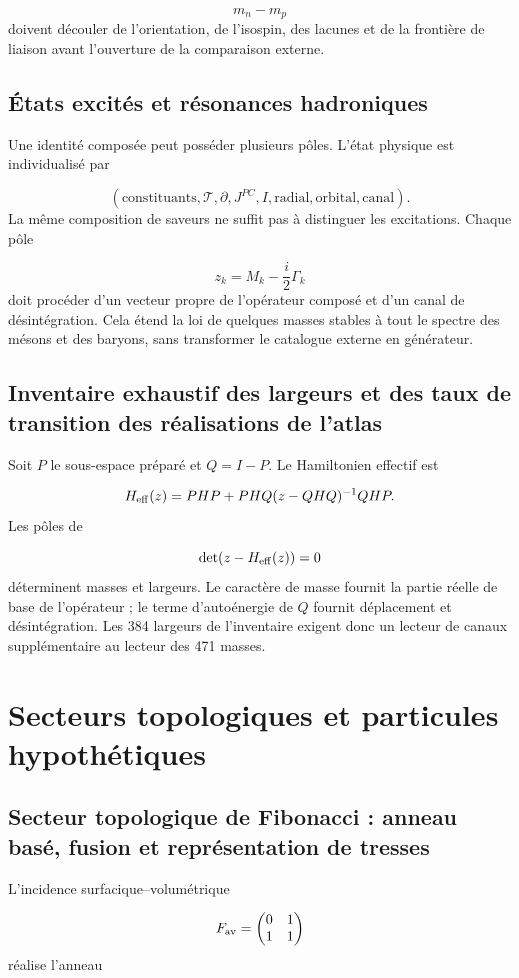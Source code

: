 \[
 m_n-m_p
\]
doivent découler de l'orientation, de l'isospin, des lacunes et de la frontière de liaison avant l'ouverture de la comparaison externe.

\subsection{États excités et résonances hadroniques}
Une identité composée peut posséder plusieurs pôles. L'état physique est individualisé par

\[
 (\text{constituants},\mathcal T,\partial,
 J^{PC},I,\text{radial},\text{orbital},\text{canal}).
\]
La même composition de saveurs ne suffit pas à distinguer les excitations. Chaque pôle

\[
 z_k=M_k-\frac{i}{2}\Gamma_k
\]
doit procéder d'un vecteur propre de l'opérateur composé et d'un canal de désintégration. Cela étend la loi de quelques masses stables à tout le spectre des mésons et des baryons, sans transformer le catalogue externe en générateur.

\subsection{Inventaire exhaustif des largeurs et des taux de transition des réalisations de l'atlas}
Soit \(P\) le sous-espace préparé et \(Q=I-P\). Le Hamiltonien effectif est

\[
 H_{\rm eff}(z)
 =PHP+PHQ(z-QHQ)^{-1}QHP.
\]
Les pôles de

\[
 \det(z-H_{\rm eff}(z))=0
\]
déterminent masses et largeurs. Le caractère de masse fournit la partie réelle de base de l'opérateur ; le terme d'autoénergie de \(Q\) fournit déplacement et désintégration. Les 384 largeurs de l'inventaire exigent donc un lecteur de canaux supplémentaire au lecteur des 471 masses.

\section{Secteurs topologiques et particules hypothétiques}
\subsection{Secteur topologique de Fibonacci : anneau basé, fusion et représentation de tresses}
L'incidence surfacique--volumétrique

\[
 F_{\rm av}=
 \begin{pmatrix}
 0&1\\1&1
 \end{pmatrix}
\]
réalise l'anneau

